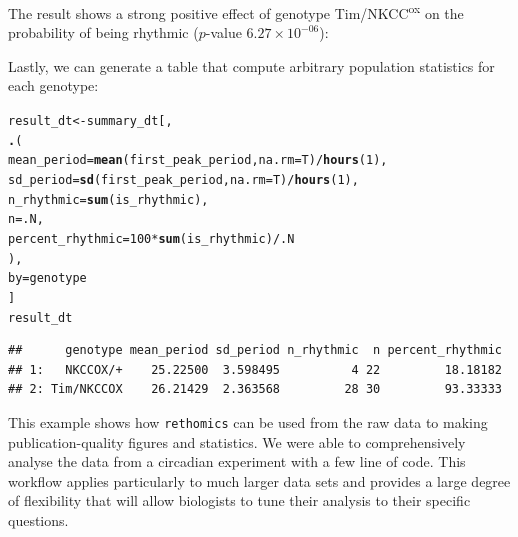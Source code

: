 \documentclass[10pt,letterpaper]{article}\usepackage[]{graphicx}\usepackage[]{color}
\makeatletter
\newcommand{\hlnum}[1]{\textcolor[rgb]{0.686,0.059,0.569}{#1}}%
\newcommand{\hlopt}[1]{\textcolor[rgb]{0,0,0}{#1}}%
\newcommand{\hlstd}[1]{\textcolor[rgb]{0.345,0.345,0.345}{#1}}%
\newcommand{\hlkwb}[1]{\textcolor[rgb]{0.69,0.353,0.396}{#1}}%
\newcommand{\hlkwc}[1]{\textcolor[rgb]{0.333,0.667,0.333}{#1}}%
\newcommand{\hlkwd}[1]{\textcolor[rgb]{0.737,0.353,0.396}{\textbf{#1}}}%
\newenvironment{kframe}{%
 \def\at@end@of@kframe{}%
 \ifinner\ifhmode%
  \def\at@end@of@kframe{\end{minipage}}%
  \begin{minipage}{\columnwidth}%
 \fi\fi%
 \def\FrameCommand##1{\hskip\@totalleftmargin \hskip-\fboxsep
 \colorbox{shadecolor}{##1}\hskip-\fboxsep
     \hskip-\linewidth \hskip-\@totalleftmargin \hskip\columnwidth}%
 \MakeFramed {\advance\hsize-\width
   \@totalleftmargin\z@ \linewidth\hsize
   \@setminipage}}%
 {\par\unskip\endMakeFramed%
 \at@end@of@kframe}
\newenvironment{knitrout}{}{} %
\makeatother
\begin{document}
The result shows a strong positive effect of genotype Tim/NKCC\textsuperscript{ox} on the probability of being rhythmic ($p$-value $6.27 \times 10^{-06}$):

Lastly, we can generate a table that compute arbitrary population statistics for each genotype:
\begin{knitrout}
\color{fgcolor}\begin{kframe}
\begin{alltt}
\hlstd{result_dt} \hlkwb{<-} \hlstd{summary_dt[,}
          \hlkwd{.}\hlstd{(}
            \hlkwc{mean_period} \hlstd{=} \hlkwd{mean}\hlstd{(first_peak_period,} \hlkwc{na.rm} \hlstd{= T)} \hlopt{/} \hlkwd{hours}\hlstd{(}\hlnum{1}\hlstd{),}
            \hlkwc{sd_period} \hlstd{=} \hlkwd{sd}\hlstd{(first_peak_period,} \hlkwc{na.rm} \hlstd{= T)} \hlopt{/} \hlkwd{hours}\hlstd{(}\hlnum{1}\hlstd{),}
            \hlkwc{n_rhythmic} \hlstd{=} \hlkwd{sum}\hlstd{(is_rhythmic),}
            \hlkwc{n} \hlstd{= .N,}
            \hlkwc{percent_rhythmic} \hlstd{=} \hlnum{100} \hlopt{*} \hlkwd{sum}\hlstd{(is_rhythmic)} \hlopt{/} \hlstd{.N}
            \hlstd{),}
          \hlkwc{by} \hlstd{= genotype}
          \hlstd{]}
\hlstd{result_dt}
\end{alltt}
\begin{verbatim}
##      genotype mean_period sd_period n_rhythmic  n percent_rhythmic
## 1:   NKCCOX/+    25.22500  3.598495          4 22         18.18182
## 2: Tim/NKCCOX    26.21429  2.363568         28 30         93.33333
\end{verbatim}
\end{kframe}
\end{knitrout}

This example shows how \texttt{rethomics} can be used from the raw data to making publication-quality figures and statistics.
We were able to comprehensively analyse the data from a circadian experiment with a few line of code.
This workflow applies particularly to much larger data sets and provides a large degree of flexibility that will allow biologists to tune their analysis to their specific questions.



% 
\end{document}
